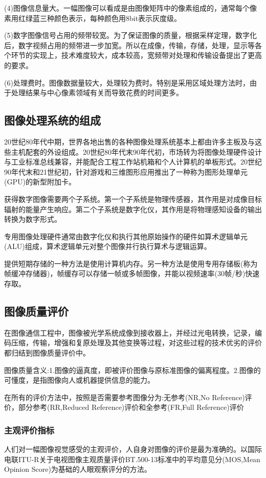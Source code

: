 \documentclass[11pt]{article}
\begin{document}
(4)图像信息量大。一幅图像可以看成是由图像矩阵中的像素组成的，通常每个像素用红绿蓝三种颜色表示，每种颜色用8bit表示灰度级。

(5)数字图像信号占用的频带较宽。为了保证图像的质量，根据采样定理，数字化后，数字视频占用的频带进一步加宽。所以在成像，传输，存储，处理，显示等各个环节的实现上，技术难度较大，成本较高，宽频带对处理和传输设备提出了更高的要求。

(6)处理费时。图像数据量较大，处理较为费时。特别是采用区域处理方法时，由于处理结果与中心像素领域有关而导致花费的时间更多。
\subsection{图像处理系统的组成}
20世纪80年代中期，世界各地出售的各种图像处理系统基本上都由许多主板及与这些主机配套的外设组成。20世纪80年代末90年代初，市场转为将图像处理硬件设计与工业标准总线兼容，并能配合工程工作站机箱和个人计算机的单板形式。20世纪90年代末和21世纪初，针对游戏和三维图形应用推出了一种称为图形处理单元(GPU)的新型附加卡。

获得数字图像需要两个子系统。第一个子系统是物理传感器，其作用是对成像目标辐射的能量产生响应。第二个子系统是数字化仪，其作用是将物理感知设备的输出转换为数字形式。

专用图像处理硬件通常由数字化仪和执行其他原始操作的硬件如算术逻辑单元(ALU)组成，算术逻辑单元对整个图像并行执行算术与逻辑运算。

提供短期存储的一种方法是使用计算机内存。另一种方法是使用专用存储板(称为帧缓冲存储器)，帧缓存可以存储一帧或多帧图像，并能以视频速率(30帧/秒)快速存取。
\subsection{图像质量评价}
在图像通信工程中，图像被光学系统成像到接收器上，并经过光电转换，记录，编码压缩，传输，增强和复原处理及其他变换等过程，对这些过程的技术优劣的评价都归结到图像质量评价中。

图像质量含义:1.图像的逼真度，即被评价图像与原标准图像的偏离程度。2.图像的可懂度，是指图像向人或机器提供信息的能力。

在所有的评价方法中，按照是否需要参考图像分为:无参考(NR,No Reference)评价，部分参考(RR,Reduced Reference)评价和全参考(FR,Full Reference)评价

\subsubsection{主观评价指标}

人们对一幅图像视觉感受的主观评价，人自身对图像的评价是最为准确的。以国际电联ITU-R关于电视图像主观质量评价BT.500-13标准中的平均意见分(MOS,Mean Opinion Score)为基础的人眼观察评分的方法。
\end{document}
